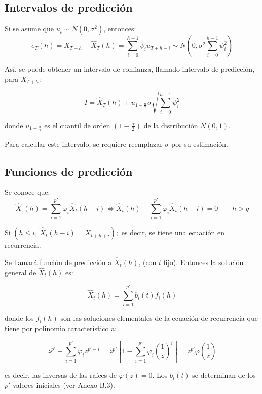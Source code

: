 \subsection{Intervalos de predicci\'{o}n}

Si se asume que $u_{t} \sim N\left( {0,\sigma^{2}} \right)$, entonces:
\[
 e_{T} (h)=X_{T+h} -\widehat{X} _{T} (h)=\sum_{i=0}^{h-1} {\psi_{i} u_{T+h-i} }  \sim N\left({0,\sigma^{2}\sum_{i=0}^{h-1} {\psi_{i}^{2} } } \right)
\]

As\'{i}, se puede obtener un intervalo de confianza, llamado intervalo de predicci\'{o}n, para $X_{T+h}$:

\[
I=\widehat{X} _{T} (h)\pm u_{1-\frac{\alpha }{2}} \sigma 
\sqrt {\sum_{i=0}^{h-1} {\psi_{i}^{2} } } 
\]

donde $u_{1-\frac{\alpha}{2}}$ es el  cuantil de orden $(1-\frac{\alpha}{2})$  de la distribuci\'{o}n $N(0,1)$.\newline

Para calcular este intervalo, se requiere reemplazar $\sigma$ por su estimaci\'{o}n.

\subsection{Funciones de predicci\'{o}n}

Se conoce que:
\[
\widehat{X}_{_{t} } (h)=\sum_{i=1}^{p'} {\varphi_{i} 
\widehat{X}_{t} (h-i)} \Longleftrightarrow \widehat{X}_{t} (h)-\sum_{i=1}^{p'} {\varphi_{i} \widehat{X}_{t}  (h-i)=0}  \qquad h>q
\]

Si $\left(h\le i,\ \widehat{X}_{t} (h-i)=X_{t+h+i} \right);$ es decir, se tiene una ecuaci\'{o}n en recurrencia.\newline

Se llamar\'{a} funci\'{o}n de predicci\'{o}n a $\widehat{X}_{t} (h)$, (con $t$ fijo). Entonces la soluci\'{o}n general de $\widehat{X} _{t} (h)$ es:

\[
\widehat{X} _{t} (h)=\sum_{i=1}^{p'} {b_{i} (t)f_{i} (h)} 
\]

donde los $f_{i}(h)$ son las soluciones elementales de la ecuaci\'{o}n de recurrencia que tiene por polinomio caracter\'{i}stico a:

\[
z^{p'}-\sum_{i=1}^{p'} {\varphi_{i} z^{p'-i}} =z^{p'}\left[ 
{1-\sum_{i=1}^{p'} {\varphi_{i} } \left( {\frac{1}{z}} \right)^{i}} 
\right]=z^{p'}\varphi \left( {\frac{1}{z}} \right)
\]

es decir, las inversas de las ra\'{i}ces de $\varphi \left( z \right)=0$. Los $b_{i}(t)$ se determinan de los $p'$ valores iniciales (ver Anexo B.3).

